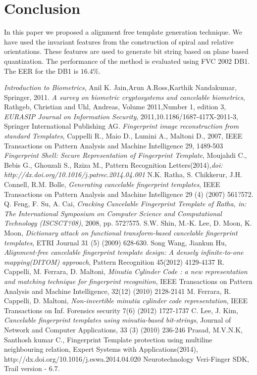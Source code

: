 \documentclass[14pt, oneside]{article}   	%
\begin{document}
\section{Conclusion}
In this paper we proposed a alignment free template generation technique. We have used the invariant features from the construction of spiral and relative orientations. These features are used to generate bit string based on plane based quantization. The performance of the method is evaluated using FVC 2002 DB1. The EER for the DB1 is $16.4\%$.
\begin{thebibliography}{9}

  \emph{ Introduction to Biometrics}, Anil K. Jain,Arun A.Ross,Karthik Nandakumar, Springer, 2011.
\emph{A survey on biometric cryptosystems and cancelable biometrics}, Rathgeb, Christian and Uhl, Andreas,   Volume 2011,Number 1, edition 3, \emph{EURASIP Journal on Information Security}, 2011,10.1186/1687-417X-2011-3, Springer International Publishing AG.
\emph{Fingerprint image reconstruction from standard Templates}, Cappelli R., Maio D., Lumini A., Maltoni D., 2007, IEEE Transactions on Pattern Analysis and Machine Intelligence 29, 1489-503
\emph{ Fingerprint Shell: Secure Representation of Fingerprint Template}, Moujahdi C., Bebis G., Ghouzali S., Rziza M., Pattern Recognition Letters(2014),\emph{doi: http://dx.doi.org/10.1016/j.patrec.2014.04.001}
N.K. Ratha, S. Chikkerur, J.H. Connell, R.M. Bolle, \emph{Generating cancelable fingerprint templates}, IEEE Transactions on Pattern Analysis and Machine Intelligence 29 (4) (2007) 561?572.
Q. Feng, F. Su, A. Cai, \emph{Cracking Cancelable Fingerprint Template of Ratha, in: The International Symposium on Computer Science and Computational Technology (ISCSCT?08)}, 2008, pp. 572?575.
S.W. Shin, M.-K. Lee, D. Moon, K. Moon, \emph{Dictionary attack on functional transform-based cancelable fingerprint templates}, ETRI Journal 31 (5) (2009) 628-630.
Song Wang, Jiankun Hu, \emph{Alignment-free cancelable fingerprint template design: A densely infinite-to-one mapping(DITOM) approach}, Pattern Recognition 45(2012) 4129-4137
R. Cappelli, M. Ferrara, D. Maltoni, \emph{Minutia Cylinder Code : a new representation and matching technique for fingerprint recognition}, IEEE Transactions on Pattern Analysis and Machine Intelligence, 32(12) (2010) 2128-2141
M. Ferrara, R. Cappelli, D. Maltoni,\emph{ Non-invertible minutia cylinder code representation}, IEEE Transactions on Inf. Forensics security 7(6) (2012) 1727-1737
C. Lee, J. Kim, \emph{Cancelable fingerprint templates using minutia-based bit-strings}, Journal of Network and Computer Applications, 33 (3) (2010) 236-246
Prasad, M.V.N.K, Santhosh kumar C., Fingerprint Template protection using multiline neighbouring relation, Expert Systems with Applications(2014), http://dx.doi.org/10.1016/j.eswa.2014.04.020
Neurotechnology Veri-Finger SDK, Trail version - 6.7.



\end{thebibliography}
\end{document}
